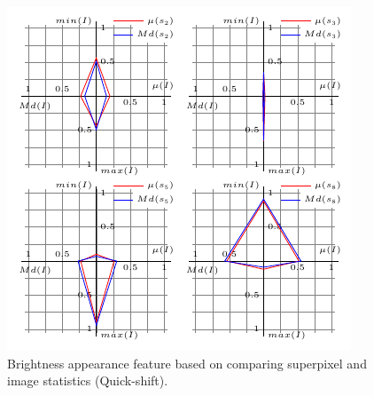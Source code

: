 \begin{frame}
\begin{figure}[Htbp]
 \includegraphics[height=.5\textheight]{appearance1Mod.pdf}

%
\caption{Brightness appearance feature based on comparing superpixel and image statistics (Quick-shift).}
\end{figure}
\end{frame}

